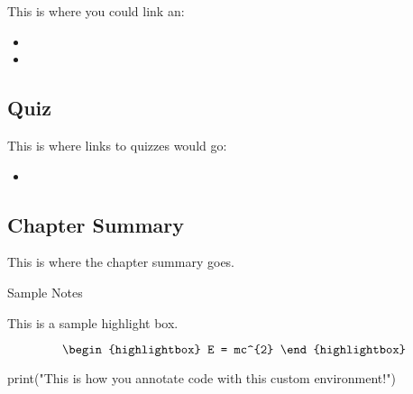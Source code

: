 This is where you could link an:

\begin{itemize}
    \item {}
    \item {}
\end{itemize}

\subsection{Quiz}

This is where links to quizzes would go:

\begin{itemize}
    \item {}
\end{itemize}

\subsection{Chapter Summary}

This is where the chapter summary goes.

\begin{notes}{Sample Notes}
    \begin{highlight}
        This is a sample highlight box.

        \begin{equation*}
            \begin{highlightbox}
                E = mc^{2}
            \end{highlightbox}
        \end{equation*}
        \lipsum[1-5]
    \end{highlight}
    \begin{code}[Python]
    print("This is how you annotate code with this custom environment!")
    \end{code}
\end{notes}
